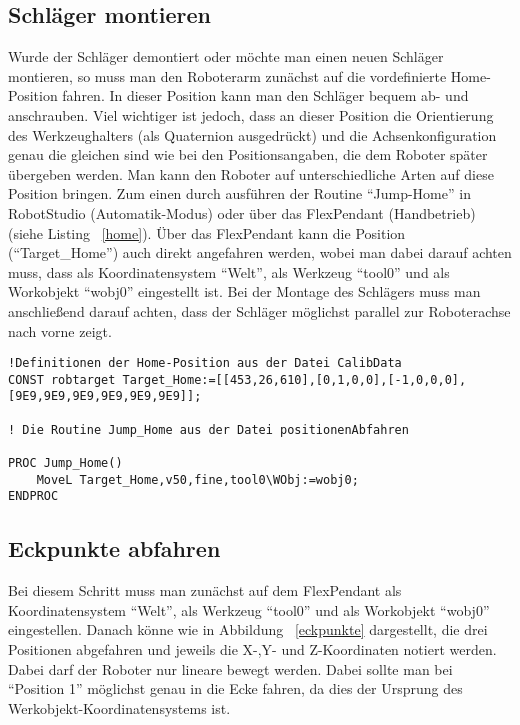 \subsection{Schläger montieren}
Wurde der Schläger demontiert oder möchte man einen neuen Schläger montieren, so muss man den Roboterarm zunächst auf die vordefinierte Home-Position fahren. In dieser Position kann man den Schläger bequem ab- und anschrauben. Viel wichtiger ist jedoch, dass an dieser Position die Orientierung des Werkzeughalters (als Quaternion ausgedrückt) und die Achsenkonfiguration genau die gleichen sind wie bei den Positionsangaben, die dem Roboter später übergeben werden. Man kann den Roboter auf unterschiedliche Arten auf diese Position bringen. Zum einen durch ausführen der Routine \enquote{Jump-Home} in RobotStudio (Automatik-Modus) oder über das FlexPendant (Handbetrieb) (siehe Listing ~\ref{home}). Über das FlexPendant kann die Position (\enquote{Target\_Home}) auch direkt angefahren werden, wobei man dabei darauf achten muss, dass als Koordinatensystem \enquote{Welt}, als Werkzeug \enquote{tool0} und als Workobjekt \enquote{wobj0} eingestellt ist. Bei der Montage des Schlägers muss man anschließend darauf achten, dass der Schläger möglichst parallel zur Roboterachse nach vorne zeigt. 

\begin{lstlisting}[caption=RAPID-Routine: Jump-Home, label=home]
!Definitionen der Home-Position aus der Datei CalibData
CONST robtarget Target_Home:=[[453,26,610],[0,1,0,0],[-1,0,0,0],[9E9,9E9,9E9,9E9,9E9,9E9]];

! Die Routine Jump_Home aus der Datei positionenAbfahren

PROC Jump_Home()
    MoveL Target_Home,v50,fine,tool0\WObj:=wobj0;
ENDPROC
\end{lstlisting} 

\subsection{Eckpunkte abfahren}

Bei diesem Schritt muss man zunächst auf dem FlexPendant als Koordinatensystem \enquote{Welt}, als Werkzeug \enquote{tool0} und als Workobjekt \enquote{wobj0} eingestellen. Danach könne wie in Abbildung ~\ref{eckpunkte} dargestellt, die drei Positionen abgefahren und jeweils die X-,Y- und Z-Koordinaten notiert werden. Dabei darf der Roboter nur lineare bewegt werden. Dabei sollte man bei \enquote{Position 1} möglichst genau in die Ecke fahren, da dies der Ursprung des Werkobjekt-Koordinatensystems ist. 

